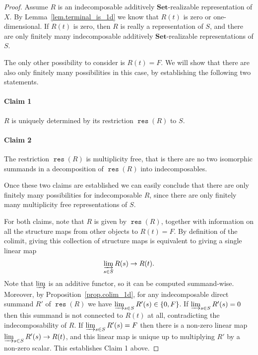 \documentclass[a4paper]{amsart}
\theoremstyle{plain}
\theoremstyle{definition}
\theoremstyle{remark}
\newcommand{\funct}[1]{\operatorname{\mathtt{#1}}}
\newcommand{\Set}{\mathbf{Set}}
\begin{document}
\begin{proof}
Assume \( R \) is an indecomposable additively \( \Set \)-realizable representation of \( X \). By Lemma~\ref{lem.terminal_is_1d} we know that \( R(t) \) is zero or one-dimensional. If \( R(t) \) is zero, then \( R \) is really a representation of \( S \), and there are only finitely many indecomposable additively \( \Set \)-realizable representations of \( S \).

The only other possibility to consider is \( R(t) = F \). We will show that there are also only finitely many possibilities in this case, by establishing the following two statements.

\paragraph{Claim 1}
\( R \) is uniquely determined by its restriction \( \funct{res}(R) \) to \( S \).

\paragraph{Claim 2}
The restriction \( \funct{res}(R) \) is multiplicity free, that is there are no two isomorphic summands in a decomposition of \( \funct{res}(R) \) into indecomposables.

Once these two claims are established we can easily conclude that there are only finitely many possibilities for indecomposable \( R \), since there are only finitely many multiplicity free representations of \( S \).

For both claims, note that \( R \) is given by \( \funct{res}(R) \), together with information on all the structure maps from other objects to \( R(t) = F \). By definition of the colimit, giving this collection of structure maps is equivalent to giving a single linear map
\[ \varinjlim_{s \in S} R(s) \to R(t). \]
Note that \( \varinjlim \) is an additive functor, so it can be computed summand-wise. Moreover, by Proposition~\ref{prop.colim_1d}, for any indecomposable direct summand \( R' \) of \( \funct{res}(R) \) we have \( \varinjlim_{s \in S} R'(s) \in \{ 0, F \} \). If \( \varinjlim_{s \in S} R'(s) = 0 \) then this summand is not connected to \( R(t) \) at all, contradicting the indecomposability of \( R \). If \( \varinjlim_{s \in S} R'(s) = F \) then there is a non-zero linear map \( \varinjlim_{s \in S} R'(s) \to R(t) \), and this linear map is unique up to multiplying \( R' \) by a non-zero scalar. This establishes Claim 1 above.


\end{proof}
\end{document}
